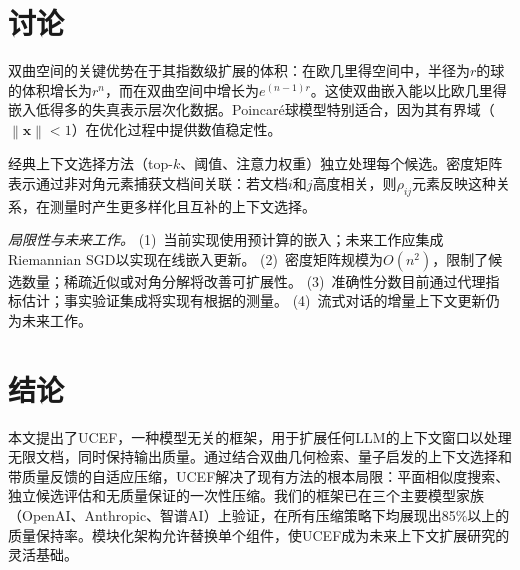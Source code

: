 \documentclass[journal]{IEEEtran}
\newcommand{\norm}[1]{\left\|#1\right\|}
\newcommand{\ucef}{\textsf{UCEF}}
\begin{document}
\section{讨论}
\label{sec:discussion}

双曲空间的关键优势在于其指数级扩展的体积：在欧几里得空间中，半径为$r$的球的体积增长为$r^{n}$，而在双曲空间中增长为$e^{(n-1)r}$。这使双曲嵌入能以比欧几里得嵌入低得多的失真表示层次化数据。Poincar\'{e}球模型特别适合，因为其有界域（$\norm{\mathbf{x}} < 1$）在优化过程中提供数值稳定性。

经典上下文选择方法（top-$k$、阈值、注意力权重）独立处理每个候选。密度矩阵表示通过非对角元素捕获文档间关联：若文档$i$和$j$高度相关，则$\rho_{ij}$元素反映这种关系，在测量时产生更多样化且互补的上下文选择。

\emph{局限性与未来工作。}
(1)~当前实现使用预计算的嵌入；未来工作应集成Riemannian SGD以实现在线嵌入更新。
(2)~密度矩阵规模为$O(n^{2})$，限制了候选数量；稀疏近似或对角分解将改善可扩展性。
(3)~准确性分数目前通过代理指标估计；事实验证集成将实现有根据的测量。
(4)~流式对话的增量上下文更新仍为未来工作。


\section{结论}
\label{sec:conclusion}

本文提出了\ucef{}，一种模型无关的框架，用于扩展任何LLM的上下文窗口以处理无限文档，同时保持输出质量。通过结合双曲几何检索、量子启发的上下文选择和带质量反馈的自适应压缩，\ucef{}解决了现有方法的根本局限：平面相似度搜索、独立候选评估和无质量保证的一次性压缩。我们的框架已在三个主要模型家族（OpenAI、Anthropic、智谱AI）上验证，在所有压缩策略下均展现出85\%以上的质量保持率。模块化架构允许替换单个组件，使\ucef{}成为未来上下文扩展研究的灵活基础。
\end{document}
